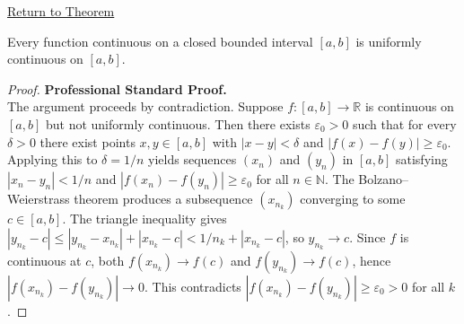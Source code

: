 \newpage
{}
\label{prf:heine-cantor}

\begin{remark*}[Return]
\hyperref[thm:heine-cantor]{Return to Theorem}
\end{remark*}

\begin{theorem*}
Every function continuous on a closed bounded interval $[a,b]$ is uniformly continuous on $[a,b]$.
\end{theorem*}

\begin{proof}
\textbf{Professional Standard Proof.}~\\
The argument proceeds by contradiction. Suppose $f \colon [a,b] \to \mathbb{R}$ is continuous on $[a,b]$ but not uniformly continuous. Then there exists $\varepsilon_{0} > 0$ such that for every $\delta > 0$ there exist points $x, y \in [a,b]$ with $|x - y| < \delta$ and $|f(x) - f(y)| \geq \varepsilon_{0}$. Applying this to $\delta = 1/n$ yields sequences $(x_{n})$ and $(y_{n})$ in $[a,b]$ satisfying $|x_{n} - y_{n}| < 1/n$ and $|f(x_{n}) - f(y_{n})| \geq \varepsilon_{0}$ for all $n \in \mathbb{N}$. The Bolzano--Weierstrass theorem produces a subsequence $(x_{n_{k}})$ converging to some $c \in [a,b]$. The triangle inequality gives $|y_{n_{k}} - c| \leq |y_{n_{k}} - x_{n_{k}}| + |x_{n_{k}} - c| < 1/n_{k} + |x_{n_{k}} - c|$, so $y_{n_{k}} \to c$. Since $f$ is continuous at $c$, both $f(x_{n_{k}}) \to f(c)$ and $f(y_{n_{k}}) \to f(c)$, hence $|f(x_{n_{k}}) - f(y_{n_{k}})| \to 0$. This contradicts $|f(x_{n_{k}}) - f(y_{n_{k}})| \geq \varepsilon_{0} > 0$ for all $k$.
\end{proof}

